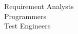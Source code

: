 \documentclass[preview]{standalone}
\begin{document}
Requirement Analysts\\Programmers\\Test Engineers\\
\end{document}
